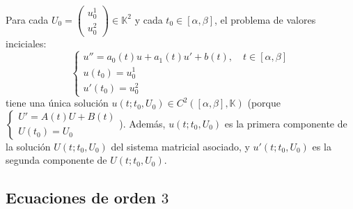 \begin{corolario}
    Para cada $U_0 = \begin{pmatrix}
        u_0^1 \\
        u_0^2
        \end{pmatrix} \in \mathbb{K}^2$ y cada $t_0 \in [\alpha, \beta]$, el problema de valores inciciales:
        \[
            \begin{cases}
                u'' = a_0(t) u + a_1(t) u' + b(t), \quad t \in [\alpha, \beta] \\
                u(t_0) = u_0^1 \\
                u'(t_0) = u_0^2
            \end{cases}
        \]
        tiene una única solución $u(t; t_0, U_0) \in C^2([\alpha, \beta], \mathbb{K})$ (porque $\begin{cases}
            U' = A(t) U + B(t) \\
            U(t_0) = U_0
        \end{cases}$). Además, $u(t; t_0, U_0)$ es la primera componente de la solución $U(t; t_0, U_0)$ del sistema matricial asociado, y $u'(t; t_0, U_0)$ es la segunda componente de $U(t; t_0, U_0)$.
\end{corolario}

\subsection{Ecuaciones de orden $3$}

